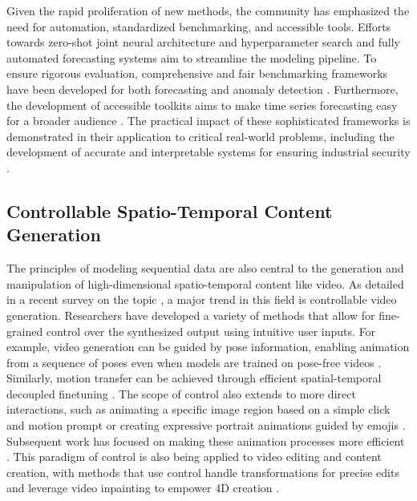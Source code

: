 Given the rapid proliferation of new methods, the community has emphasized the need for automation, standardized benchmarking, and accessible tools. Efforts towards zero-shot joint neural architecture and hyperparameter search \citep{AutoCTS++} and fully automated forecasting systems \citep{wu2024fully} aim to streamline the modeling pipeline. To ensure rigorous evaluation, comprehensive and fair benchmarking frameworks have been developed for both forecasting \citep{qiu2024tfb} and anomaly detection \citep{qiu2025tab}. Furthermore, the development of accessible toolkits aims to make time series forecasting easy for a broader audience \citep{qiu2025easytime}. The practical impact of these sophisticated frameworks is demonstrated in their application to critical real-world problems, including the development of accurate and interpretable systems for ensuring industrial security \citep{wang2023accurate}.

\subsection{Controllable Spatio-Temporal Content Generation}
The principles of modeling sequential data are also central to the generation and manipulation of high-dimensional spatio-temporal content like video. As detailed in a recent survey on the topic \citep{ma2025controllable}, a major trend in this field is controllable video generation. Researchers have developed a variety of methods that allow for fine-grained control over the synthesized output using intuitive user inputs. For example, video generation can be guided by pose information, enabling animation from a sequence of poses even when models are trained on pose-free videos \citep{ma2024followpose}. Similarly, motion transfer can be achieved through efficient spatial-temporal decoupled finetuning \citep{ma2025followyourmotion}. The scope of control also extends to more direct interactions, such as animating a specific image region based on a simple click and motion prompt \citep{ma2025followyourclick} or creating expressive portrait animations guided by emojis \citep{ma2024followyouremoji}. Subsequent work has focused on making these animation processes more efficient \citep{ma2025followfaster}. This paradigm of control is also being applied to video editing and content creation, with methods that use control handle transformations for precise edits \citep{ma2023magicstick} and leverage video inpainting to empower 4D creation \citep{ma2025followcreation}.